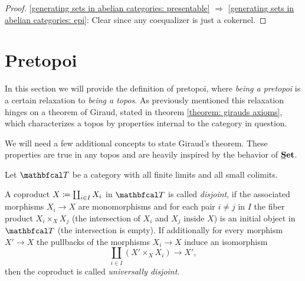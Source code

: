\begin{proof}
	\ref{generating sets in abelian categories: presentable} $\Rightarrow$ \ref{generating sets in abelian categories: epi}:\newline
	Clear since any coequalizer is just a cokernel.
\end{proof}


\section{Pretopoi}
\label{section: pretopoi}

In this section we will provide the definition of pretopoi, where \emph{being a pretopoi} is a certain relaxation to \emph{being a topos}. As previously mentioned this relaxation hinges on a theorem of Giraud, stated in theorem \ref{theorem: girauds axioms}, which characterizes a topos by properties internal to the category in question. 

We will need a few additional concepts to state Giraud's theorem. These properties are true in any topos and are heavily inspired by the behavior of ${{\mathbf{\underline{S}et}}}$. 

\begin{definition}
	Let $\category T$ be a category with all finite limits and all small colimits.
	
	A coproduct $X\coloneqq \coprod_{i\in I} X_i$ in $\category T$ is called \emph{disjoint}, if the associated morphisms $X_i\to X$ are monomorphisms and for each pair $i\ne j$ in $I$ the fiber product $X_i\times_X X_j$ (the intersection of $X_i$ and $X_j$ inside $X$) is an initial object in $\category T$ (\ie the intersection is empty). If additionally for every morphism $X'\to X$ the pullbacks of the morphisms $X_i\to X$ induce an isomorphism
		$$\coprod_{i \in I} (X'\times_X X_i) \to X',$$
	then the coproduct is called \emph{universally disjoint}.
\end{definition}

